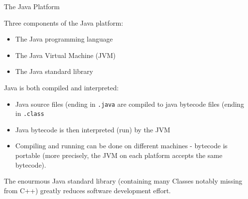 \documentclass{beamer}
\begin{document}
\begin{frame}[fragile]{The Java Platform}


Three components of the Java platform:
\begin{itemize}
\item The Java programming language
\item The Java Virtual Machine (JVM)
\item The Java standard library
\end{itemize}
Java is both compiled and interpreted:
\begin{itemize}
\item Java source files (ending in {\tt .java} are compiled to java
  bytecode files (ending in {\tt .class}
\item Java bytecode is then interpreted (run) by the JVM
\item Compiling and running can be done on different machines -
  bytecode is portable (more precisely, the JVM on each platform
  accepts the same bytecode).
\end{itemize}
The enourmous Java standard library (containing many Classes notably
missing from C++) greatly reduces software development effort.
\end{frame}





\end{document}
